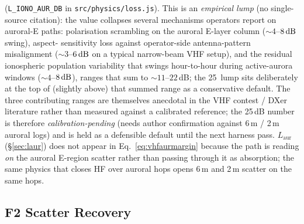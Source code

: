 \documentclass[11pt,a4paper]{article}
\newcommand{\SI}[2]{#1\,\text{#2}}
\newcommand{\dB}{\text{dB}}
\begin{document}
(\texttt{L\_IONO\_AUR\_DB} in \texttt{src/physics/loss.js}).
This is an \emph{empirical lump} (no single-source citation):
the value collapses several mechanisms operators report on
auroral-E paths: polarisation scrambling on the auroral
E-layer column ($\sim\!4$--$\SI{8}{\dB}$ swing), aspect-
sensitivity loss against operator-side antenna-pattern
misalignment ($\sim\!3$--$\SI{6}{\dB}$ on a typical
narrow-beam VHF setup), and the residual ionospheric
population variability that swings hour-to-hour during
active-aurora windows ($\sim\!4$--$\SI{8}{\dB}$), ranges
that sum to ${\sim}11$--$22$\,dB; the \SI{25}{\dB} lump sits
deliberately at the top of (slightly above) that summed range
as a conservative default.  The three
contributing ranges are themselves anecdotal in the VHF
contest / DXer literature rather than measured against a
calibrated reference; the 25\,dB number is therefore
\emph{calibration-pending} (needs author confirmation against
6\,m / 2\,m auroral logs) and is held as a defensible
default until the next harness pass.  $L_{\text{aur}}$
(\S\ref{sec:laur}) does not appear in
Eq.~\ref{eq:vhfaurmargin} because the path is reading
\emph{on} the auroral E-region scatter rather than passing
through it as absorption; the same physics that closes HF over
auroral hops opens 6\,m and 2\,m scatter on the same hops.

\subsection{F2 Scatter Recovery}\label{sec:scatter}
\end{document}
